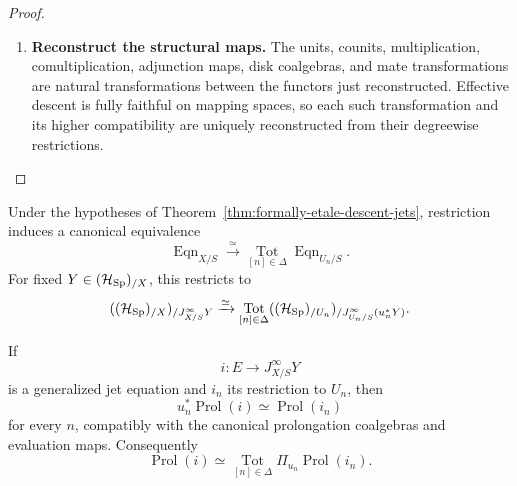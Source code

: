 \begin{proof}
\begin{enumerate}[label=\textup{(\arabic*)}]
    \item \textbf{Reconstruct the structural maps.}
The units, counits, multiplication, comultiplication, adjunction maps, disk
coalgebras, and mate transformations are natural transformations between the
functors just reconstructed. Effective descent is fully faithful on mapping
spaces, so each such transformation and its higher compatibility are uniquely
reconstructed from their degreewise restrictions.
\end{enumerate}
\end{proof}

\begin{corollary}
\label{cor:formally-etale-equation-descent}
Under the hypotheses of
Theorem~\ref{thm:formally-etale-descent-jets}, restriction induces a canonical
equivalence
\[
  \operatorname{Eqn}_{X/S}
  \xrightarrow{\simeq}
  \operatorname*{Tot}_{[n]\in\Delta}
  \operatorname{Eqn}_{U_n/S}.
\]
For fixed \(Y\in(\mathcal H_{\operatorname{Sp}})_{/X}\), this restricts to
\[
  ((\mathcal H_{\operatorname{Sp}})_{/X})_{/J^\infty_{X/S}Y}
  \xrightarrow{\simeq}
  \operatorname*{Tot}_{[n]\in\Delta}
  ((\mathcal H_{\operatorname{Sp}})_{/U_n})_{
    /J^\infty_{U_n/S}(u_n^*Y)}.
\]

If
\[
  i:E\to J^\infty_{X/S}Y
\]
is a generalized jet equation and \(i_n\) its restriction to \(U_n\), then
\[
  u_n^*\operatorname{Prol}(i)
  \simeq
  \operatorname{Prol}(i_n)
\]
for every \(n\), compatibly with the canonical prolongation coalgebras and
evaluation maps. Consequently
\[
  \operatorname{Prol}(i)
  \simeq
  \operatorname*{Tot}_{[n]\in\Delta}
  \Pi_{u_n}\operatorname{Prol}(i_n).
\]
\end{corollary}

